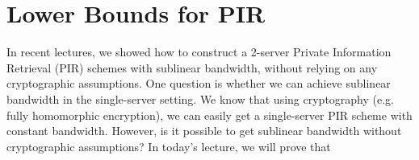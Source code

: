 \newcommand{\bits}{\{0,1\}}
\newcommand{\bfu}{\mathbf{u}}
\newcommand{\bfv}{\mathbf{v}}
\newcommand{\bfp}{\mathbf{p}}
\newcommand{\bfz}{\mathbf{z}}
\newcommand{\bfx}{\mathbf{x}}
\newcommand{\bfy}{\mathbf{y}}

\newcommand{\calR}{\mathcal{R}}
\newcommand{\FHE}{\ensuremath{{\sf FHE}}}
\newcommand{\Gen}{\ensuremath{{\sf Gen}}}
\newcommand{\Eval}{\ensuremath{{\sf Eval}}}
\newcommand{\Enc}{\ensuremath{{\sf Enc}}}
\newcommand{\Dec}{\ensuremath{{\sf Dec}}}
\newcommand{\DB}{\ensuremath{{\sf DB}}}

\newcommand{\CNextMsg}{\ensuremath{{\sf C Next Msg}}}
\newcommand{\SNextMsg}{\ensuremath{{\sf S Next Msg}}}
\newcommand{\CNext}{\ensuremath{{\sf C Next}}}
\newcommand{\SNext}{\ensuremath{{\sf S Next}}}
\newcommand{\Cstp}{\ensuremath{{\sf Cst'}}}
\newcommand{\Cst}{\ensuremath{{\sf Cst}}}
\newcommand{\msg}{\ensuremath{{\sf msg}}}
\newcommand{\msgp}{\ensuremath{{\sf msg'}}}
\newcommand{\Coutput}{\ensuremath{{\sf Reconstr}}}
\newcommand{\ans}{\ensuremath{{\sf ans}}}
\newcommand{\Ccoins}{\ensuremath{{\sf Ccoins}}}
\newcommand{\Scoins}{\ensuremath{{\sf Scoins}}}
\newcommand{\Comm}{\ensuremath{{\sf Comm}}}
\newcommand{\Expt}{\ensuremath{{\sf Expt}}}
\newcommand{\coin}{\ensuremath{{\sf coin}}}
\newcommand{\View}{\ensuremath{{\sf View}}}
\newcommand{\negl}{\ensuremath{{\sf negl}}}
\newcommand{\PPT}{PPT }
\newcommand{\Out}{\ensuremath{{\sf Out}}}
\newcommand{\OWF}{\ensuremath{{\sf OWF}}}
\newcommand{\OT}{\ensuremath{{\sf OT}}}
\newcommand{\PIR}{\ensuremath{{\sf PIR}}}
\newcommand{\Server}{\ensuremath{{\sf Server}}}
\newcommand{\Client}{\ensuremath{{\sf Client}}}
\newcommand{\Alice}{\ensuremath{{\sf Alice}}}
\newcommand{\Bob}{\ensuremath{{\sf Bob}}}
\newcommand{\getr}{\ensuremath{~{\overset{\$}{\leftarrow}}}~}
\newcommand{\get}{\ensuremath{\leftarrow}}
\newcommand{\E}{\ensuremath{{\bf E}}}
\newcommand{\out}{\ensuremath{{\sf out}}}

\newcommand{\ignore}[1]{}

\newtheorem{claim}[theorem]{Claim}



\section{Lower Bounds for PIR}

In recent lectures, we showed how to construct a 2-server Private Information Retrieval (PIR) schemes with sublinear bandwidth, without relying on any cryptographic assumptions. 
One question is whether we can achieve sublinear bandwidth in the single-server setting.
We know that using cryptography (e.g. fully homomorphic encryption), we can 
easily get a single-server PIR scheme with constant bandwidth. 
However, is it possible to get sublinear bandwidth without cryptographic assumptions?
In today's lecture, we will prove that 

